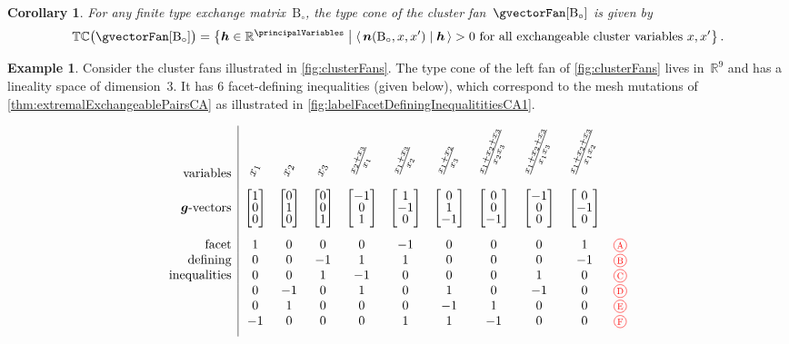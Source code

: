 \documentclass{amsart}
\newtheorem{corollary}[theorem]{Corollary}
\theoremstyle{definition}
\newtheorem{example}[theorem]{Example}
\newcommand{\R}{\mathbb{R}} %
\renewcommand{\b}[1]{{\boldsymbol{#1}}} %
\newcommand{\set}[2]{\left\{ #1 \;\middle|\; #2 \right\}} %
\newcommand{\dotprod}[2]{\left\langle \, #1 \; \middle| \; #2 \, \right\rangle} %
\newcommand{\red}{\color{red}} %
\newcommand*\circled[1]{\tikz[baseline=(char.base)]{\node[shape=circle, draw, inner sep=1.5pt, scale=.7] (char) {#1};}}
\newcommand{\compactVectorT}[3]{\begin{bmatrix} #1 \\[-.1cm] #2 \\[-.1cm] #3 \end{bmatrix}}
\newcommand{\typeCone}{\mathbb{TC}} %
\newcommand{\B}{\mathrm{B}} %
\begin{document}
\begin{corollary}
\label{coro:typeConeCA}
For any finite type exchange matrix~$\B_\circ$, the type cone of the cluster fan~$\gvectorFan[\B_\circ]$ is given by
\[
\typeCone \big( \gvectorFan[\B_\circ] \big) = \set{\b{h} \in \R^{\principalVariables}}{\dotprod{\b{n}(\B_\circ, x, x')}{\b{h}} > 0 \text{ for all exchangeable cluster variables } x, x'}.
\]
\end{corollary}

\begin{example}
\label{exm:typeConeCA}
Consider the cluster fans illustrated in \cref{fig:clusterFans}.
The type cone of the left fan of \cref{fig:clusterFans} lives in~$\R^9$ and has a lineality space of dimension~$3$.
It has $6$ facet-defining inequalities (given below), which correspond to the mesh mutations of \cref{thm:extremalExchangeablePairsCA} as illustrated in \cref{fig:labelFacetDefiningInequalititiesCA1}.

\[
\begin{array}{r|cccccccccc}
\text{variables} & \rotatebox{70}{$x_1$} & \rotatebox{70}{$x_2$} & \rotatebox{70}{$x_3$} & \rotatebox{70}{$\frac{x_2 + x_3}{x_1}$} & \rotatebox{70}{$\frac{x_1 + x_3}{x_2}$} & \rotatebox{70}{$\frac{x_1 + x_2}{x_3}$} & \rotatebox{70}{$\frac{x_1 + x_2 + x_3}{x_2 x_3}$} & \rotatebox{70}{$\frac{x_1 + x_2 + x_3}{x_1 x_3}$} & \rotatebox{70}{$\frac{x_1 + x_2 + x_3}{x_1 x_2}$} \\[.2cm]
\text{$\b{g}$-vectors} & \compactVectorT{1}{0}{0} & \compactVectorT{0}{1}{0} & \compactVectorT{0}{0}{1} & \compactVectorT{-1}{0}{1} & \compactVectorT{1}{-1}{0} & \compactVectorT{0}{1}{-1} & \compactVectorT{0}{0}{-1} & \compactVectorT{-1}{0}{0} & \compactVectorT{0}{-1}{0} \\[.6cm]
\text{facet} 		& 1 & 0 & 0 & 0 & -1 & 0 & 0 & 0 & 1 & \red \circled{A} \\
\text{defining}		& 0 & 0 & -1 & 1 & 1 & 0 & 0 & 0 & -1 & \red \circled{B} \\
\text{inequalities}	& 0 & 0 & 1 & -1 & 0 & 0 & 0 & 1 & 0 & \red \circled{C} \\
 					& 0 & -1 & 0 & 1 & 0 & 1 & 0 & -1 & 0 & \red \circled{D} \\
 					& 0 & 1 & 0 & 0 & 0 & -1 & 1 & 0 & 0 & \red \circled{E} \\
					& -1 & 0 & 0 & 0 & 1 & 1 & -1 & 0 & 0 & \red \circled{F} \\[.2cm]
\end{array}
\]



\end{example}
\end{document}
